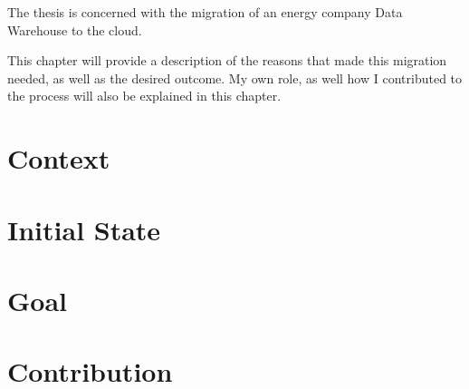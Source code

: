 The thesis is concerned with the migration of an energy company Data Warehouse to the cloud.

This chapter will provide a description of the reasons that made this migration needed, as well as the desired outcome.
My own role, as well how I contributed to the process will also be explained in this chapter.

\section{Context}
    
\section{Initial State}
    
\section{Goal}
    
\section{Contribution}
    
